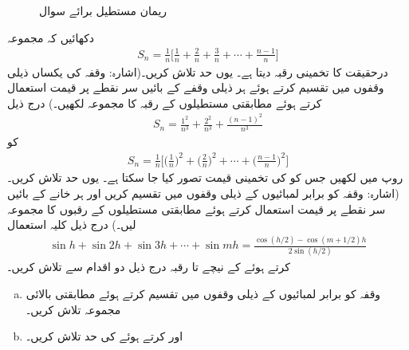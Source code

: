 \begin{figure}
\begin{minipage}{0.40\textwidth}
\caption{ریمان مستطیل برائے سوال }
\label{شکل_سوال_تکمل_ریمان_مجموعہ_مربع}
\end{minipage}
\end{figure}
دکھائیں کہ مجموعہ
\begin{align*}
S_n=\frac{1}{n}\big[\frac{1}{n}+\frac{2}{n}+\frac{3}{n}+\cdots+\frac{n-1}{n}\big]
\end{align*}
درحقیقت  کا تخمینی رقبہ دیتا ہے۔ یوں حد  تلاش کریں۔(اشارہ: وقفہ  کی  یکساں  ذیلی وقفوں میں تقسیم کرتے ہوئے ہر ذیلی وقفے کے  بائیں سر نقطے پر  قیمت استعمال کرتے ہوئے مطابقتی مستطیلوں کے رقبہ کا مجموعہ لکھیں۔)
درج ذیل
\begin{align*}
S_n=\frac{1^2}{n^3}+\frac{2^2}{n^3}+\frac{(n-1)^2}{n^3}
\end{align*}
کو
\begin{align*}
S_n=\frac{1}{n}\big[\big(\frac{1}{n})^2+\big(\frac{2}{n}\big)^2+\cdots+\big(\frac{n-1}{n}\big)^2\big]
\end{align*}
روپ میں لکھیں جس کو  کی تخمینی قیمت تصور کیا جا سکتا ہے۔ یوں حد  تلاش کریں۔ (اشارہ: وقفہ  کو  برابر لمبائیوں کے ذیلی وقفوں میں تقسیم کریں اور ہر خانے کے بائیں سر نقطے پر قیمت استعمال کرتے ہوئے مطابقتی مستطیلوں کے رقبوں کا مجموعہ لیں۔)
درج ذیل کلیہ استعمال 
\begin{align*}
\sin h+\sin 2h+\sin 3h+\cdots+\sin mh=\frac{\cos(h/2)-\cos(m+1/2)h}{2\sin(h/2)}
\end{align*}
کرتے ہوئے  کے نیچے  تا  رقبہ درج ذیل دو اقدام سے تلاش کریں۔
\begin{enumerate}[a.]
\item
وقفہ  کو  برابر لمبائیوں کے ذیلی وقفوں میں تقسیم کرتے ہوئے مطابقتی بالائی مجموعہ  تلاش کریں۔
\item
{} اور  کرتے ہوئے  کی حد تلاش کریں۔
\end{enumerate}
